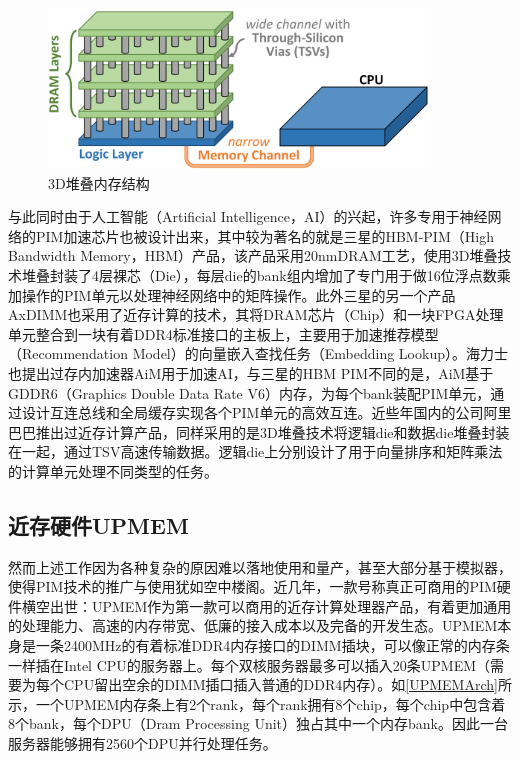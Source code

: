 \begin{figure}[!htbp]
	\centering
    \includegraphics[width=0.9\textwidth]{figures/3DStack.png}
    \caption{3D堆叠内存结构}
	\label{3DStack}
\end{figure}

与此同时由于人工智能（Artificial Intelligence，AI）的兴起，许多专用于神经网络的PIM加速芯片也被设计出来，其中较为著名的就是三星的HBM-PIM（High Bandwidth Memory，HBM）产品\cite{SamsungHBMPIM}，该产品采用20nmDRAM工艺，使用3D堆叠技术堆叠封装了4层裸芯（Die），每层die的bank组内增加了专门用于做16位浮点数乘加操作的PIM单元以处理神经网络中的矩阵操作。此外三星的另一个产品AxDIMM\cite{AxDIMM}也采用了近存计算的技术，其将DRAM芯片（Chip）和一块FPGA处理单元整合到一块有着DDR4标准接口的主板上，主要用于加速推荐模型（Recommendation Model）的向量嵌入查找任务（Embedding Lookup）。海力士也提出过存内加速器AiM\cite{AiM}用于加速AI，与三星的HBM PIM不同的是，AiM基于GDDR6（Graphics Double Data Rate V6）内存，为每个bank装配PIM单元，通过设计互连总线和全局缓存实现各个PIM单元的高效互连。近些年国内的公司阿里巴巴推出过近存计算产品\cite{AlibabaPIM}，同样采用的是3D堆叠技术将逻辑die和数据die堆叠封装在一起，通过TSV高速传输数据。逻辑die上分别设计了用于向量排序和矩阵乘法的计算单元处理不同类型的任务。

\subsection{近存硬件UPMEM}
然而上述工作因为各种复杂的原因难以落地使用和量产，甚至大部分基于模拟器，使得PIM技术的推广与使用犹如空中楼阁。近几年，一款号称真正可商用的PIM硬件横空出世：UPMEM作为第一款可以商用的近存计算处理器产品\cite{UPMEMHotChips}，有着更加通用的处理能力、高速的内存带宽、低廉的接入成本以及完备的开发生态。UPMEM本身是一条2400MHz的有着标准DDR4内存接口的DIMM插块，可以像正常的内存条一样插在Intel CPU的服务器上。每个双核服务器最多可以插入20条UPMEM（需要为每个CPU留出空余的DIMM插口插入普通的DDR4内存）。如\ref{UPMEMArch}所示，一个UPMEM内存条上有2个rank，每个rank拥有8个chip，每个chip中包含着8个bank，每个DPU（Dram Processing Unit）独占其中一个内存bank。因此一台服务器能够拥有2560个DPU并行处理任务。

